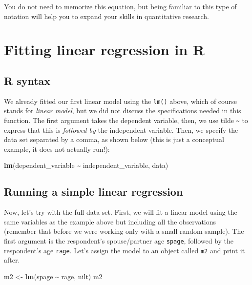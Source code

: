 \documentclass[
]{book}
\newenvironment{Shaded}{\begin{snugshade}}{\end{snugshade}}
\newcommand{\FunctionTok}[1]{\textcolor[rgb]{0.13,0.29,0.53}{\textbf{#1}}}
\newcommand{\NormalTok}[1]{#1}
\newcommand{\OtherTok}[1]{\textcolor[rgb]{0.56,0.35,0.01}{#1}}
\newcommand{\SpecialCharTok}[1]{\textcolor[rgb]{0.81,0.36,0.00}{\textbf{#1}}}
\begin{document}
You do not need to memorize this equation, but being familiar to this type of notation will help you to expand your skills in quantitative research.

\hypertarget{fitting-linear-regression-in-r}{%
\section{Fitting linear regression in R}\label{fitting-linear-regression-in-r}}

\hypertarget{r-syntax}{%
\subsection{R syntax}\label{r-syntax}}

We already fitted our first linear model using the \texttt{lm()} above, which of course stands for \emph{linear model}, but we did not discuss the specifications needed in this function. The first argument takes the dependent variable, then, we use tilde \texttt{\textasciitilde{}} to express that this is \emph{followed by} the independent variable. Then, we specify the data set separated by a comma, as shown below (this is just a conceptual example, it does not actually run!):

\begin{Shaded}
\begin{Highlighting}[]
\FunctionTok{lm}\NormalTok{(dependent\_variable }\SpecialCharTok{\textasciitilde{}}\NormalTok{ independent\_variable, data)}
\end{Highlighting}
\end{Shaded}

\hypertarget{running-a-simple-linear-regression}{%
\subsection{Running a simple linear regression}\label{running-a-simple-linear-regression}}

Now, let's try with the full data set. First, we will fit a linear model using the same variables as the example above but including all the observations (remember that before we were working only with a small random sample). The first argument is the respondent's spouse/partner age \texttt{spage}, followed by the respondent's age \texttt{rage}. Let's assign the model to an object called \texttt{m2} and print it after.

\begin{Shaded}
\begin{Highlighting}[]
\NormalTok{m2 }\OtherTok{\textless{}{-}} \FunctionTok{lm}\NormalTok{(spage }\SpecialCharTok{\textasciitilde{}}\NormalTok{ rage, nilt)}
\NormalTok{m2}
\end{Highlighting}
\end{Shaded}
\end{document}
